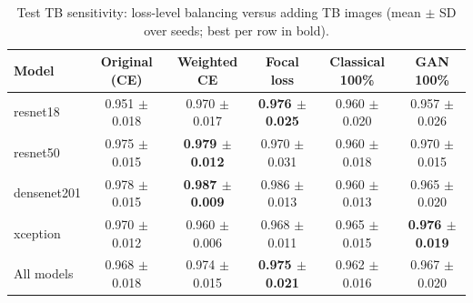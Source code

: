 \begin{table}[htbp]
\centering
\caption{Test TB sensitivity: loss-level balancing versus adding TB images (mean $\pm$ SD over seeds; best per row in bold).}
\label{tab:loss_tb_recall}
\begin{tabular}{lccccc}
\toprule
Model & Original (CE) & Weighted CE & Focal loss & Classical 100\% & GAN 100\% \\
\midrule
resnet18 & 0.951 $\pm$ 0.018 & 0.970 $\pm$ 0.017 & \textbf{0.976 $\pm$ 0.025} & 0.960 $\pm$ 0.020 & 0.957 $\pm$ 0.026 \\
resnet50 & 0.975 $\pm$ 0.015 & \textbf{0.979 $\pm$ 0.012} & 0.970 $\pm$ 0.031 & 0.960 $\pm$ 0.018 & 0.970 $\pm$ 0.015 \\
densenet201 & 0.978 $\pm$ 0.015 & \textbf{0.987 $\pm$ 0.009} & 0.986 $\pm$ 0.013 & 0.960 $\pm$ 0.013 & 0.965 $\pm$ 0.020 \\
xception & 0.970 $\pm$ 0.012 & 0.960 $\pm$ 0.006 & 0.968 $\pm$ 0.011 & 0.965 $\pm$ 0.015 & \textbf{0.976 $\pm$ 0.019} \\
\midrule
All models & 0.968 $\pm$ 0.018 & 0.974 $\pm$ 0.015 & \textbf{0.975 $\pm$ 0.021} & 0.962 $\pm$ 0.016 & 0.967 $\pm$ 0.020 \\
\bottomrule
\end{tabular}
\end{table}